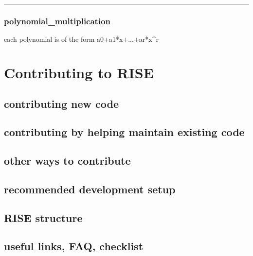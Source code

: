 \documentclass[letterpaper,10pt,english]{sphinxmanual}
\begin{document}
\bigskip\hrule{}\bigskip



\subsection{polynomial\_multiplication}
\label{classes/utils/@hdmr/hdmr:polynomial-multiplication}\label{classes/utils/@hdmr/hdmr:id3}
each polynomial is of the form a0+a1*x+...+ar*x\textasciicircum{}r


\chapter{Contributing to RISE}
\label{contributing:contributing-to-rise}\label{contributing::doc}

\section{contributing new code}
\label{contributing:contributing-new-code}

\section{contributing by helping maintain existing code}
\label{contributing:contributing-by-helping-maintain-existing-code}

\section{other ways to contribute}
\label{contributing:other-ways-to-contribute}

\section{recommended development setup}
\label{contributing:recommended-development-setup}

\section{RISE structure}
\label{contributing:rise-structure}

\section{useful links, FAQ, checklist}
\label{contributing:useful-links-faq-checklist}
\end{document}
